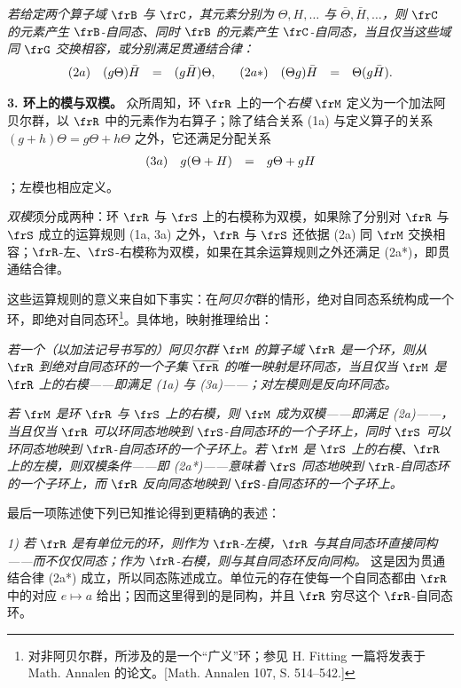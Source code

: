 \emph{若给定两个算子域 \(\frB\) 与 \(\frC\)，其元素分别为 \(\Theta,H,\ldots\) 与 \(\bar\Theta,\bar H,\ldots\)，则 \(\frC\) 的元素产生 \(\frB\)-自同态、同时 \(\frB\) 的元素产生 \(\frC\)-自同态，当且仅当这些域同 \(\frG\) 交换相容，或分别满足贯通结合律：}
\[
        \begin{array}{r@{\quad}c@{\quad}c@{\quad}c@{\qquad}r@{\quad}c@{\quad}c@{\quad}c}
        (2a) & (g\Theta)\bar H &=& (g\bar H)\Theta, &
        (2a*) & (\Theta g)\bar H &=& \Theta(g\bar H).
        \end{array}
\]

\noindent\textbf{3. 环上的模与双模。} 众所周知，环 \(\frR\) 上的一个\emph{右模} \(\frM\) 定义为一个加法阿贝尔群，以 \(\frR\) 中的元素作为右算子；除了结合关系 (1a) 与定义算子的关系 \((g+h)\Theta=g\Theta+h\Theta\) 之外，它还满足分配关系
\[
        \begin{array}{r@{\quad}c@{\quad}c@{\quad}c}
        (3a) & g(\Theta+H) &=& g\Theta+gH
        \end{array}
\]
；左模也相应定义。

\emph{双模}须分成两种：环 \(\frR\) 与 \(\frS\) 上的右模称为双模，如果除了分别对 \(\frR\) 与 \(\frS\) 成立的运算规则 (1a, 3a) 之外，\(\frR\) 与 \(\frS\) 还依据 (2a) 同 \(\frM\) 交换相容；\(\frR\)-左、\(\frS\)-右模称为双模，如果在其余运算规则之外还满足 (2a*)，即贯通结合律。

这些运算规则的意义来自如下事实：在\emph{阿贝尔}群的情形，绝对自同态系统构成一个环，即绝对自同态环\footnote{对非阿贝尔群，所涉及的是一个“广义”环；参见 H. Fitting 一篇将发表于 Math. Annalen 的论文。[Math. Annalen 107, S. 514--542.] }。具体地，映射推理给出：

\emph{若一个（以加法记号书写的）阿贝尔群 \(\frM\) 的算子域 \(\frR\) 是一个环，则从 \(\frR\) 到绝对自同态环的一个子集 \(\overline{\frR}\) 的唯一映射是环同态，当且仅当 \(\frM\) 是 \(\frR\) 上的右模——即满足 (1a) 与 (3a)——；对左模则是反向环同态。}

\emph{若 \(\frM\) 是环 \(\frR\) 与 \(\frS\) 上的右模，则 \(\frM\) 成为双模——即满足 (2a)——，当且仅当 \(\frR\) 可以环同态地映到 \(\frS\)-自同态环的一个子环上，同时 \(\frS\) 可以环同态地映到 \(\frR\)-自同态环的一个子环上。若 \(\frM\) 是 \(\frS\) 上的右模、\(\frR\) 上的左模，则双模条件——即 (2a*)——意味着 \(\frS\) 同态地映到 \(\frR\)-自同态环的一个子环上，而 \(\frR\) 反向同态地映到 \(\frS\)-自同态环的一个子环上。}

最后一项陈述使下列已知推论得到更精确的表述：

\emph{1) 若 \(\frR\) 是有单位元的环，则作为 \(\frR\)-左模，\(\frR\) 与其自同态环直接同构——而不仅仅同态；作为 \(\frR\)-右模，则与其自同态环反向同构。} 这是因为贯通结合律 (2a*) 成立，所以同态陈述成立。单位元的存在使每一个自同态都由 \(\frR\) 中的对应 \(e\mapsto a\) 给出；因而这里得到的是同构，并且 \(\frR\) 穷尽这个 \(\frR\)-自同态环。

